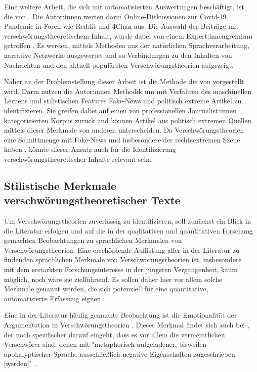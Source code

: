 Eine weitere Arbeit, die sich mit automatisierten Auswertungen beschäftigt, ist die von \textcite{shahsavari_2020}.
Die Autor:innen werten darin Online-Diskussionen zur Covid-19 Pandemie in Foren wie Reddit und 4Chan aus.
Die Auswahl der Beiträge mit verschwörungstheoretischem Inhalt, wurde dabei von einem Expert:innengremium getroffen \parencite[284f]{shahsavari_2020}.
Es werden, mittels Methoden aus der natürlichen Sprachverarbeitung, narrative Netzwerke ausgewertet und so Verbindungen zu den Inhalten von Nachrichten und den aktuell populärsten Verschwörungstheorien aufgezeigt.

Näher an der Problemstellung dieser Arbeit ist die Methode die von \textcite{potthast_2018} vorgestellt wird.
Darin nutzen die Autor:innen Methodik um mit Verfahren des maschinellen Lernens und stilistischen Features Fake-News und politisch extreme Artikel zu identifizieren.
Sie greifen dabei auf einen von professionellen Journalist:innen kategorisierten Korpus zurück und können Artikel aus politisch extremen Quellen mittels dieser Merkmale von anderen unterscheiden.
Da Verschwörungstheorien eine Schnittmenge mit Fake-News und insbesondere der rechtsextremen Szene haben \parencite[vgl.][]{stumpf_2019}, könnte dieser Ansatz auch für die Identifizierung verschwörungstheoretischer Inhalte relevant sein.

\subsection{Stilistische Merkmale verschwörungstheoretischer Texte}

Um Verschwörungstheorien zuverlässig zu identifizieren, soll zunächst ein Blick in die Literatur erfolgen und auf die in der qualitativen und quantitativen Forschung gemachten Beobachtungen zu sprachlichen Merkmalen von Verschwörungstheorien.
Eine erschöpfende Auflistung aller in der Literatur zu findenden sprachlichen Merkmale von Verschwörungstheorien ist, insbesondere mit dem erstarkten Forschungsinteresse in der jüngsten Vergangenheit, kaum möglich, noch wäre sie zielführend.
Es sollen daher hier vor allem solche Merkmale genannt werden, die sich potenziell für eine quantitative, automatisierte Erfassung eignen.

Eine in der Literatur häufig gemachte Beobachtung ist die Emotionalität der Argumentation in Verschwörungstheorien \parencite[vgl.][10]{miller_2002}.
Dieses Merkmal findet sich auch bei \textcite[][93ff]{butter_2018}, der noch spezifischer darauf eingeht, dass es vor allem die vermeintlichen Verschwörer sind, denen mit "metaphorisch aufgeladener, bisweilen apokalyptischer Sprache ausschließlich negative Eigenschaften zugeschrieben [werden]" \parencite[][93f]{butter_2018}.

